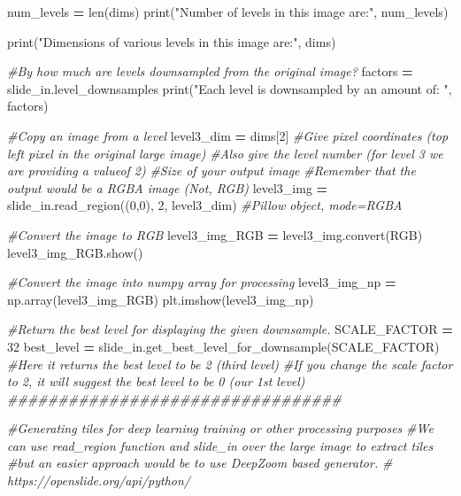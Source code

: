 \documentclass[
]{book}
\newenvironment{Shaded}{\begin{snugshade}}{\end{snugshade}}
\newcommand{\BuiltInTok}[1]{#1}
\newcommand{\CommentTok}[1]{\textcolor[rgb]{0.56,0.35,0.01}{\textit{#1}}}
\newcommand{\DecValTok}[1]{\textcolor[rgb]{0.00,0.00,0.81}{#1}}
\newcommand{\NormalTok}[1]{#1}
\newcommand{\OperatorTok}[1]{\textcolor[rgb]{0.81,0.36,0.00}{\textbf{#1}}}
\newcommand{\StringTok}[1]{\textcolor[rgb]{0.31,0.60,0.02}{#1}}
\begin{document}
\begin{Shaded}
\begin{Highlighting}[]
\NormalTok{num\_levels }\OperatorTok{=} \BuiltInTok{len}\NormalTok{(dims)}
\BuiltInTok{print}\NormalTok{(}\StringTok{"Number of levels in this image are:"}\NormalTok{, num\_levels)}

\BuiltInTok{print}\NormalTok{(}\StringTok{"Dimensions of various levels in this image are:"}\NormalTok{, dims)}

\CommentTok{\#By how much are levels downsampled from the original image?}
\NormalTok{factors }\OperatorTok{=}\NormalTok{ slide\_in.level\_downsamples}
\BuiltInTok{print}\NormalTok{(}\StringTok{"Each level is downsampled by an amount of: "}\NormalTok{, factors)}

\CommentTok{\#Copy an image from a level}
\NormalTok{level3\_dim }\OperatorTok{=}\NormalTok{ dims[}\DecValTok{2}\NormalTok{]}
\CommentTok{\#Give pixel coordinates (top left pixel in the original large image)}
\CommentTok{\#Also give the level number (for level 3 we are providing a valueof 2)}
\CommentTok{\#Size of your output image}
\CommentTok{\#Remember that the output would be a RGBA image (Not, RGB)}
\NormalTok{level3\_img }\OperatorTok{=}\NormalTok{ slide\_in.read\_region((}\DecValTok{0}\NormalTok{,}\DecValTok{0}\NormalTok{), }\DecValTok{2}\NormalTok{, level3\_dim) }\CommentTok{\#Pillow object, mode=RGBA}

\CommentTok{\#Convert the image to RGB}
\NormalTok{level3\_img\_RGB }\OperatorTok{=}\NormalTok{ level3\_img.convert(}\StringTok{\textquotesingle{}RGB\textquotesingle{}}\NormalTok{)}
\NormalTok{level3\_img\_RGB.show()}

\CommentTok{\#Convert the image into numpy array for processing}
\NormalTok{level3\_img\_np }\OperatorTok{=}\NormalTok{ np.array(level3\_img\_RGB)}
\NormalTok{plt.imshow(level3\_img\_np)}


\CommentTok{\#Return the best level for displaying the given downsample.}
\NormalTok{SCALE\_FACTOR }\OperatorTok{=} \DecValTok{32}
\NormalTok{best\_level }\OperatorTok{=}\NormalTok{ slide\_in.get\_best\_level\_for\_downsample(SCALE\_FACTOR)}
\CommentTok{\#Here it returns the best level to be 2 (third level)}
\CommentTok{\#If you change the scale factor to 2, it will suggest the best level to be 0 (our 1st level)}
\CommentTok{\#\#\#\#\#\#\#\#\#\#\#\#\#\#\#\#\#\#\#\#\#\#\#\#\#\#\#\#\#\#\#\#\#}

\CommentTok{\#Generating tiles for deep learning training or other processing purposes}
\CommentTok{\#We can use read\_region function and slide\_in over the large image to extract tiles}
\CommentTok{\#but an easier approach would be to use DeepZoom based generator.}
\CommentTok{\# https://openslide.org/api/python/}


\end{Highlighting}
\end{Shaded}
\end{document}
